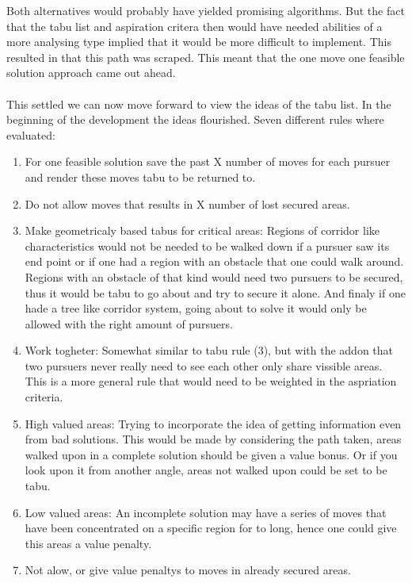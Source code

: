 Both alternatives would probably have yielded promising algorithms. But the fact that the tabu list and aspiration critera then would have needed abilities of a more analysing type implied that it would be more difficult to implement. This resulted in that this path was scraped. This meant that the one move one feasible solution approach came out ahead.\\
\\
This settled we can now move forward to view the ideas of the tabu list. In the beginning of the development the ideas flourished. Seven different rules where evaluated:
\begin{enumerate}
\item{}For one feasible solution save the past X number of moves for each pursuer and render these moves tabu to be returned to.
\item{}Do not allow moves that results in X number of lost secured areas.
\item{}Make geometricaly based tabus for critical areas:
\subitem{} Regions of corridor like characteristics would not be needed to be walked down if a pursuer saw its end point or if one had a region with an obstacle that one could walk around. Regions with an obstacle of that kind would need two pursuers to be secured, thus it would be tabu to go about and try to secure it alone. And finaly if one hade a tree like corridor system, going about to solve it would only be allowed with the right amount of pursuers.
\item{} Work togheter:
\subitem{} Somewhat similar to tabu rule (3), but with the addon that two pursuers never really need to see each other only share vissible areas. This is  a more general rule that would need to be weighted in the aspriation criteria.
\item{} High valued areas:
\subitem{} Trying to incorporate the idea of getting information even from bad solutions. This would be made by considering the path taken, areas walked upon in a complete solution should be given a value bonus. Or if you look upon it from another angle, areas not walked upon could be set to be tabu. 
\item{} Low valued areas:
\subitem {}An incomplete solution may have a series of moves that have been concentrated on a specific region for to long, hence one could give this areas a value penalty.
\item{} Not alow, or give value penaltys to moves in already secured areas.
\end{enumerate}

